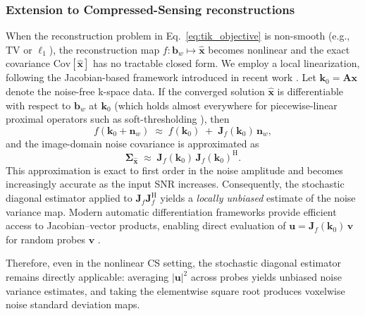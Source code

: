 \documentclass[AMA,STIX2COL,Linenumberson]{MRM}
\begin{document}
\subsubsection{Extension to Compressed-Sensing reconstructions}
\label{subsec:cs_extension}
When the reconstruction problem in Eq.~\eqref{eq:tik_objective} is 
non-smooth (e.g., TV or $\ell_1$), the reconstruction map 
$f:\mathbf{b}_w\mapsto\hat{\mathbf{x}}$ becomes nonlinear \cite{Lustig2008} and the exact covariance 
$\mathrm{Cov}[\hat{\mathbf{x}}]$ has no tractable closed form. We employ a local linearization, following the Jacobian-based 
framework introduced in recent work 
\cite{dalmaz2025efficient,Dawood2024}. Let 
$\mathbf{k}_0 = \mathbf{A}\mathbf{x}$ denote the noise-free 
k-space data. If the converged solution $\hat{\mathbf{x}}$ is 
differentiable with respect to $\mathbf{b}_w$ at $\mathbf{k}_0$ 
(which holds almost everywhere for piecewise-linear proximal 
operators such as soft-thresholding 
\cite{dalmaz2025efficient,Dawood2024}), then
\[
f(\mathbf{k}_0 + \mathbf{n}_w)\;\approx\; f(\mathbf{k}_0)
  \;+\; \mathbf{J}_f(\mathbf{k}_0)\,\mathbf{n}_w,
\]
and the image-domain noise covariance is approximated as
\[
\boldsymbol{\Sigma}_{\hat{\mathbf{x}}} \;\approx\; 
  \mathbf{J}_f(\mathbf{k}_0)\,
  \mathbf{J}_f(\mathbf{k}_0)^{\mathrm{H}}.
\]
This approximation is exact to first order in the noise amplitude 
and becomes increasingly accurate as the input SNR increases. 
Consequently, the stochastic diagonal estimator applied to 
$\mathbf{J}_f\mathbf{J}_f^{\mathrm{H}}$ yields a 
\emph{locally unbiased} estimate of the noise variance map. Modern automatic differentiation 
frameworks provide efficient access to Jacobian--vector products, 
enabling direct evaluation of 
$\mathbf{u} = \mathbf{J}_f(\mathbf{k}_0)\,\mathbf{v}$ for random 
probes $\mathbf{v}$ \cite{dalmaz2025efficient,Dawood2024,homolya2025raki}.

Therefore, even in the nonlinear CS setting, the stochastic diagonal 
estimator remains directly applicable: averaging 
$|\mathbf{u}|^2$ across probes yields unbiased noise variance 
estimates, and taking the elementwise square root produces voxelwise 
noise standard deviation maps.
\end{document}
